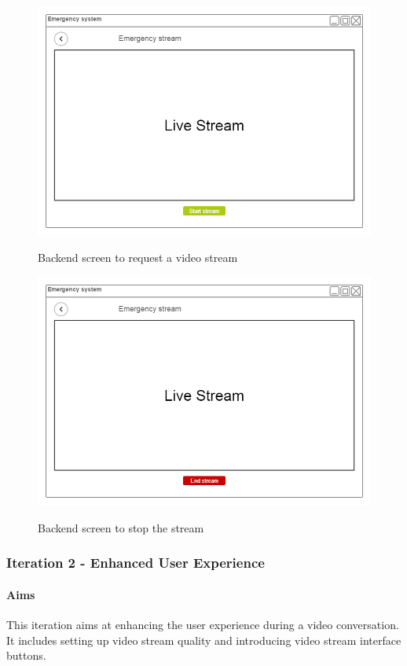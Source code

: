 \documentclass{article}
\begin{document}
	\begin{figure}[H]
		\centering
		\includegraphics[width=.9\textwidth]{"EmergencyAppIteration1/iteration1backend"}
		
		Backend screen to request a video stream
	\end{figure}

	\begin{figure}[H]
		\centering
		\includegraphics[width=.9\textwidth]{"EmergencyAppIteration1/iteration1backend (1)"}
		
		Backend screen to stop the stream
	\end{figure}

	\pagebreak
	\subsubsection{Iteration 2 - Enhanced User Experience}
			\paragraph{Aims}
			This iteration aims at enhancing  the user experience during a video conversation. It includes setting up video stream quality and introducing video stream interface buttons.
\end{document}
